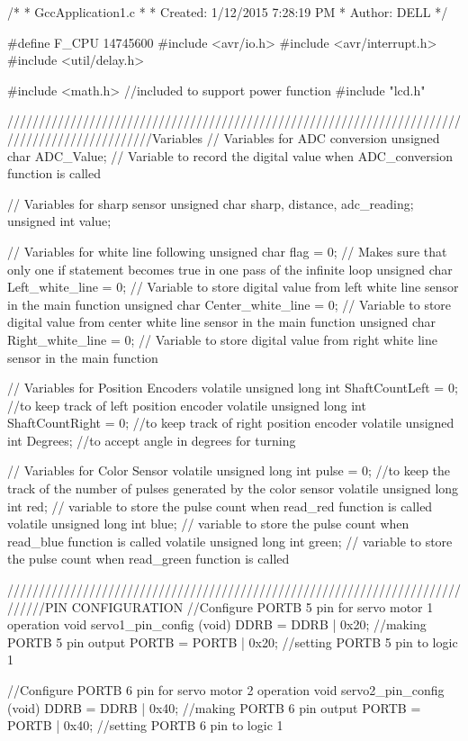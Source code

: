 /*
 * GccApplication1.c
 *
 * Created: 1/12/2015 7:28:19 PM
 *  Author: DELL
 */ 


#define F_CPU 14745600
#include <avr/io.h>
#include <avr/interrupt.h>
#include <util/delay.h>

#include <math.h> //included to support power function
#include "lcd.h"

///////////////////////////////////////////////////////////////////////////////////////////////Variables
// Variables for ADC conversion
unsigned char ADC_Value;    // Variable to record the digital value when ADC_conversion function is called

// Variables for sharp sensor
unsigned char sharp, distance, adc_reading;
unsigned int value;

// Variables for white line following
unsigned char flag = 0;     // Makes sure that only one if statement becomes true in one pass of the infinite loop
unsigned char Left_white_line = 0;   // Variable to store digital value from left white line sensor in the main function
unsigned char Center_white_line = 0; // Variable to store digital value from center white line sensor in the main function
unsigned char Right_white_line = 0;  // Variable to store digital value from right white line sensor in the main function

// Variables for Position Encoders
volatile unsigned long int ShaftCountLeft = 0;  //to keep track of left position encoder
volatile unsigned long int ShaftCountRight = 0; //to keep track of right position encoder
volatile unsigned int Degrees;                  //to accept angle in degrees for turning

// Variables for Color Sensor
volatile unsigned long int pulse = 0; //to keep the track of the number of pulses generated by the color sensor
volatile unsigned long int red;       // variable to store the pulse count when read_red function is called
volatile unsigned long int blue;      // variable to store the pulse count when read_blue function is called
volatile unsigned long int green;     // variable to store the pulse count when read_green function is called

//////////////////////////////////////////////////////////////////////////////PIN CONFIGURATION
//Configure PORTB 5 pin for servo motor 1 operation
void servo1_pin_config (void)
{
	DDRB  = DDRB | 0x20;  //making PORTB 5 pin output            
	PORTB = PORTB | 0x20; //setting PORTB 5 pin to logic 1
}

//Configure PORTB 6 pin for servo motor 2 operation
void servo2_pin_config (void)
{
	DDRB  = DDRB | 0x40;  //making PORTB 6 pin output
	PORTB = PORTB | 0x40; //setting PORTB 6 pin to logic 1
}

